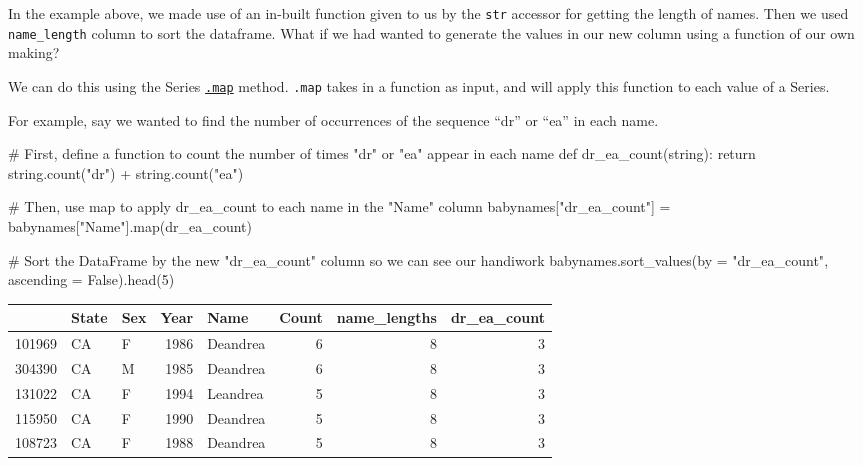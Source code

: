 \documentclass[
  letterpaper,
  DIV=11,
  numbers=noendperiod]{scrreprt}
\newenvironment{Shaded}{\begin{snugshade}}{\end{snugshade}}
\newcommand{\BuiltInTok}[1]{\textcolor[rgb]{0.00,0.23,0.31}{#1}}
\newcommand{\CommentTok}[1]{\textcolor[rgb]{0.37,0.37,0.37}{#1}}
\newcommand{\ControlFlowTok}[1]{\textcolor[rgb]{0.00,0.23,0.31}{#1}}
\newcommand{\DecValTok}[1]{\textcolor[rgb]{0.68,0.00,0.00}{#1}}
\newcommand{\KeywordTok}[1]{\textcolor[rgb]{0.00,0.23,0.31}{#1}}
\newcommand{\NormalTok}[1]{\textcolor[rgb]{0.00,0.23,0.31}{#1}}
\newcommand{\OperatorTok}[1]{\textcolor[rgb]{0.37,0.37,0.37}{#1}}
\newcommand{\StringTok}[1]{\textcolor[rgb]{0.13,0.47,0.30}{#1}}
\newcommand{\VariableTok}[1]{\textcolor[rgb]{0.07,0.07,0.07}{#1}}
\begin{document}
In the example above, we made use of an in-built function given to us by
the \texttt{str} accessor for getting the length of names. Then we used
\texttt{name\_length} column to sort the dataframe. What if we had
wanted to generate the values in our new column using a function of our
own making?

We can do this using the Series
\href{https://pandas.pydata.org/docs/reference/api/pandas.Series.map.html}{\texttt{.map}}
method. \texttt{.map} takes in a function as input, and will apply this
function to each value of a Series.

For example, say we wanted to find the number of occurrences of the
sequence ``dr'' or ``ea'' in each name.

\begin{Shaded}
\begin{Highlighting}[]
\CommentTok{\# First, define a function to count the number of times "dr" or "ea" appear in each name}
\KeywordTok{def}\NormalTok{ dr\_ea\_count(string):}
    \ControlFlowTok{return}\NormalTok{ string.count(}\StringTok{"dr"}\NormalTok{) }\OperatorTok{+}\NormalTok{ string.count(}\StringTok{"ea"}\NormalTok{)}

\CommentTok{\# Then, use \textasciigrave{}map\textasciigrave{} to apply \textasciigrave{}dr\_ea\_count\textasciigrave{} to each name in the "Name" column}
\NormalTok{babynames[}\StringTok{"dr\_ea\_count"}\NormalTok{] }\OperatorTok{=}\NormalTok{ babynames[}\StringTok{"Name"}\NormalTok{].}\BuiltInTok{map}\NormalTok{(dr\_ea\_count)}

\CommentTok{\# Sort the DataFrame by the new "dr\_ea\_count" column so we can see our handiwork}
\NormalTok{babynames.sort\_values(by }\OperatorTok{=} \StringTok{"dr\_ea\_count"}\NormalTok{, ascending }\OperatorTok{=} \VariableTok{False}\NormalTok{).head(}\DecValTok{5}\NormalTok{)}
\end{Highlighting}
\end{Shaded}

\begin{tabular}{lllrlrrr}
\toprule
{} & State & Sex &  Year &      Name &  Count &  name\_lengths &  dr\_ea\_count \\
\midrule
101969 &    CA &   F &  1986 &  Deandrea &      6 &             8 &            3 \\
304390 &    CA &   M &  1985 &  Deandrea &      6 &             8 &            3 \\
131022 &    CA &   F &  1994 &  Leandrea &      5 &             8 &            3 \\
115950 &    CA &   F &  1990 &  Deandrea &      5 &             8 &            3 \\
108723 &    CA &   F &  1988 &  Deandrea &      5 &             8 &            3 \\
\bottomrule
\end{tabular}
\end{document}
